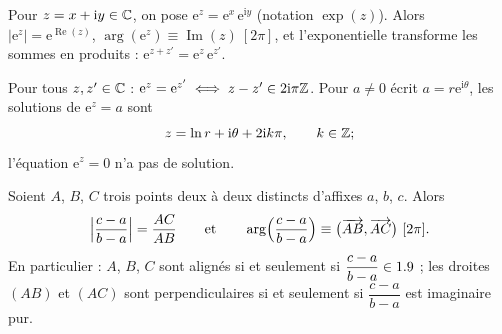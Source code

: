 \begin{definition}
Pour $z=x+\mathrm{i}y\in\mathbb{C}$, on pose
$\mathrm{e}^{z}=\mathrm{e}^{x}\,\mathrm{e}^{\mathrm{i}y}$ (notation
$\exp(z)$). Alors $|\mathrm{e}^{z}|=\mathrm{e}^{\operatorname{Re}(z)}$,
$\arg(\mathrm{e}^{z})\equiv\operatorname{Im}(z)\ [2\pi]$, et l'exponentielle
transforme les sommes en produits :
$\mathrm{e}^{z+z'}=\mathrm{e}^{z}\,\mathrm{e}^{z'}$.
\end{definition}

\begin{propriete}[Équation $\exp(z)=a$]
Pour tous $z,z'\in\mathbb{C}$ :
$\mathrm{e}^{z}=\mathrm{e}^{z'}\iff z-z'\in2\mathrm{i}\pi\mathbb{Z}$.
Pour $a\neq0$ écrit $a=r\mathrm{e}^{\mathrm{i}\theta}$, les solutions de
$\mathrm{e}^{z}=a$ sont
\[
  z=\ln r+\mathrm{i}\theta+2\mathrm{i}k\pi,\qquad k\in\mathbb{Z} ;
\]
l'équation $\mathrm{e}^{z}=0$ n'a pas de solution.
\end{propriete}


\begin{theoreme}
Soient $A$, $B$, $C$ trois points deux à deux distincts d'affixes $a$, $b$,
$c$. Alors
\[
  \Bigl|\frac{c-a}{b-a}\Bigr|=\frac{AC}{AB}
  \qquad\text{et}\qquad
  \arg\Bigl(\frac{c-a}{b-a}\Bigr)\equiv\bigl(\vect{AB},\vect{AC}\bigr)\ [2\pi].
\]
En particulier : $A$, $B$, $C$ sont alignés si et seulement si
$\dfrac{c-a}{b-a}\in1.9$ ; les droites $(AB)$ et $(AC)$ sont perpendiculaires
si et seulement si $\dfrac{c-a}{b-a}$ est imaginaire pur.
\end{theoreme}

